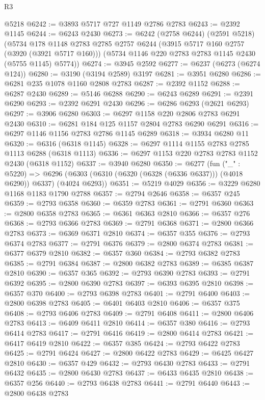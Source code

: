 \begin{lexlean}{R3}
\begin{coremodule}
    @5218
@6242 := @3893 @5717 @727 @1149 @2786 @2783
@6243 := @2392 @1145
@6244 := @6243 @2430
@6273 := @6242
    (@2758 @6244)
    (@2591 @5218)
    (@5734
      @178
      @1148
      @2783
      @2785
      @2757
      @6244
      (@3915 @5717 @160 @2757 (@3920 (@3921 @5717 @160)))
      (@5734 @1146 @220 @2783 @2783 @1145 @2430 (@5755 @1145) @5774))
@6274 := @3945 @2592
@6277 := @6237 (@6273 (@6274 @124))
@6280 := @3190 (@3194 @2589) @3197
@6281 := @3951 @6280
@6286 := @6281 @235 @1078 @1160 @2808 @2783
@6287 := @2392 @1152
@6288 := @6287 @2430
@6289 := @5146 @6288
@6290 := @6243 @6289
@6291 := @2391 @6290
@6293 := @2392 @6291 @2430
@6296 := @6286 @6293 (@2621 @6293)
@6297 := @3906 @6280
@6303 := @6297 @1158 @220 @2806 @2783 @6291 @2430
@6310 := @6281 @184 @125 @1157 @2804 @2783 @6290 @6291
@6316 := @6297 @1146 @1156 @2783 @2786 @1145 @6289
@6318 := @3934 @6280 @11
@6320 := @6316 (@6318 @1145)
@6328 := @6297 @1114 @1155 @2783 @2785 @1113 @6288 (@6318 @1113)
@6336 := @6297 @1153 @220 @2783 @2783 @1152 @2430 (@6318 @1152)
@6337 := @3940 @6280
@6350 := @6277
    (fun ("_" : @5220) =>
    @6296 (@6303 (@6310 (@6320 (@6328 (@6336 @6337))) (@4018 @6290)) @6337) (@4024 @6293))
@6351 := @5219 @4029
@6356 := @3229 @6280 @1168 @1183 @1790 @2788
@6357 := @2794 @2646
@6358 := @6357 @245
@6359 := @2793 @6358
@6360 := @6359 @2783
@6361 := @2791 @6360
@6363 := @2800 @6358 @2783
@6365 := @6361 @6363 @2810
@6366 := @6357 @276
@6368 := @2793 @6366 @2783
@6369 := @2791 @6368
@6371 := @2800 @6366 @2783
@6373 := @6369 @6371 @2810
@6374 := @6357 @355
@6376 := @2793 @6374 @2783
@6377 := @2791 @6376
@6379 := @2800 @6374 @2783
@6381 := @6377 @6379 @2810
@6382 := @6357 @360
@6384 := @2793 @6382 @2783
@6385 := @2791 @6384
@6387 := @2800 @6382 @2783
@6389 := @6385 @6387 @2810
@6390 := @6357 @365
@6392 := @2793 @6390 @2783
@6393 := @2791 @6392
@6395 := @2800 @6390 @2783
@6397 := @6393 @6395 @2810
@6398 := @6357 @370
@6400 := @2793 @6398 @2783
@6401 := @2791 @6400
@6403 := @2800 @6398 @2783
@6405 := @6401 @6403 @2810
@6406 := @6357 @375
@6408 := @2793 @6406 @2783
@6409 := @2791 @6408
@6411 := @2800 @6406 @2783
@6413 := @6409 @6411 @2810
@6414 := @6357 @380
@6416 := @2793 @6414 @2783
@6417 := @2791 @6416
@6419 := @2800 @6414 @2783
@6421 := @6417 @6419 @2810
@6422 := @6357 @385
@6424 := @2793 @6422 @2783
@6425 := @2791 @6424
@6427 := @2800 @6422 @2783
@6429 := @6425 @6427 @2810
@6430 := @6357 @429
@6432 := @2793 @6430 @2783
@6433 := @2791 @6432
@6435 := @2800 @6430 @2783
@6437 := @6433 @6435 @2810
@6438 := @6357 @256
@6440 := @2793 @6438 @2783
@6441 := @2791 @6440
@6443 := @2800 @6438 @2783

\end{coremodule}
\end{lexlean}
